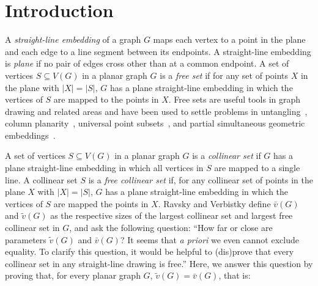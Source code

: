

\section{Introduction}


A \emph{straight-line embedding} of a graph $G$ maps each vertex to a point in the plane and each edge to a line segment between its endpoints. A straight-line
embedding is \emph{plane} if no pair of edges cross other than at a
common endpoint. A set
of vertices  $S\subseteq V(G)$ in a planar graph $G$ is a \emph{free
  set} if for any set of points $X$ in the plane with $|X|=|S|$, $G$ has a plane
straight-line embedding in which the vertices of $S$ are mapped to the points in $X$.  Free sets are useful tools in graph drawing
and related areas and have been used to settle problems in untangling~\cite{bose.dujmovic.ea:polynomial,dalozzo.dujmovic.ea:drawing,dujmovic:utility,ravsky.verbitsky:on,ravsky.verbitsky:on-arxiv}, column planarity~\cite{dalozzo.dujmovic.ea:drawing,dujmovic:utility}, universal point subsets~\cite{dalozzo.dujmovic.ea:drawing,dujmovic:utility},
and partial simultaneous geometric embeddings~\cite{dujmovic:utility}.

 A set of vertices  $S\subseteq V(G)$ in a planar graph $G$ is a
 \emph{collinear set} if $G$ has a plane straight-line embedding in
 which all vertices in $S$ are mapped to a single line.  A collinear set $S$
is a \emph{free collinear set} if, for any collinear set of points in
the plane $X$ with $|X|=|S|$, $G$ has a plane straight-line embedding in
which the vertices of $S$ are mapped the points in $X$.  
Ravsky and Verbistky \cite{ravsky.verbitsky:on,ravsky.verbitsky:on-arxiv}
define $\bar{v}(G)$ and $\tilde{v}(G)$ as the respective sizes of the
largest collinear set and largest free collinear set in $G$, and ask
the following question:
	``How far or close are parameters $\tilde{v}(G)$ and $\bar{v}(G)$? It
	seems that \emph{a priori} we even cannot exclude equality. To clarify
	this question, it would be helpful to (dis)prove that every collinear
	set in any straight-line drawing is free.''
%
Here, we answer this question by proving that, for every planar graph $G$,
$\tilde{v}(G)=\bar{v}(G)$, that is:

